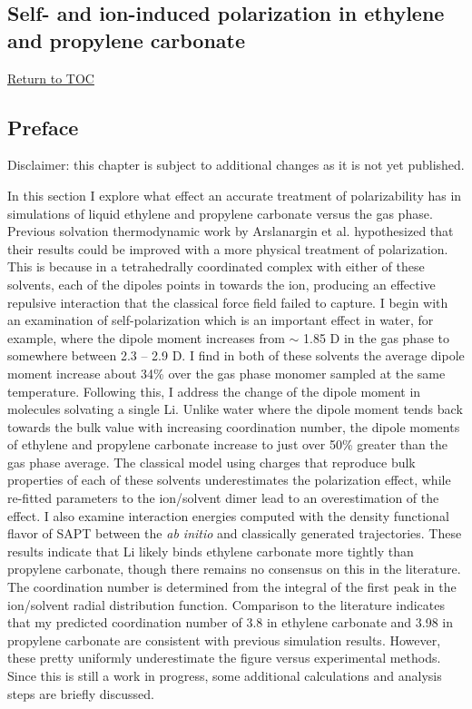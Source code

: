 \begin{ecpc}
 \chapter{Self- and ion-induced polarization in ethylene and propylene carbonate}
 \hyperlink{toc}{Return to TOC} 
  \section{\label{ch4:sec0:level1}Preface}
   
   Disclaimer: this chapter is subject to additional changes as it is not yet published.
   
   In this section I explore what effect an accurate treatment of polarizability has in simulations of liquid ethylene and propylene carbonate versus 
   the gas phase. Previous solvation thermodynamic work by Arslanargin et al. hypothesized that their results could be improved with a more physical
   treatment of polarization\cite{ayse2016ecpc}. This is because in a tetrahedrally coordinated complex with either of these solvents, each of the
   dipoles points in towards the ion, producing an effective repulsive interaction that the classical force field failed to capture. I begin with an
   examination of self-polarization which is an important effect in water, for example, where the dipole moment increases from $\sim$ 1.85 D in the 
   gas phase to somewhere between 2.3 -- 2.9 D. I find in both of these solvents the average dipole moment increase about 34\% over the gas phase 
   monomer sampled at the same temperature. Following this, I address the change of the dipole moment in molecules solvating a single Li\sur{+}.
   Unlike water where the dipole moment tends back towards the bulk value with increasing coordination number, the dipole moments of ethylene and
   propylene carbonate increase to just over 50\% greater than the gas phase average. The classical model using charges that reproduce bulk properties
   of each of these solvents underestimates the polarization effect, while re-fitted parameters to the ion/solvent dimer lead to an overestimation
   of the effect. I also examine interaction energies computed with the density functional flavor of SAPT between the \emph{ab initio} and classically
   generated trajectories. These results indicate that Li\sur{+} likely binds ethylene carbonate more tightly than propylene carbonate, though there
   remains no consensus on this in the literature. The coordination number is determined from the integral of the first peak in the ion/solvent 
   radial distribution function. Comparison to the literature indicates that my predicted coordination number of 3.8 in ethylene carbonate and 3.98
   in propylene carbonate are consistent with previous simulation results. However, these pretty uniformly underestimate the figure versus experimental
   methods. Since this is still a work in progress, some additional calculations and analysis steps are briefly discussed.
   

\end{ecpc}
